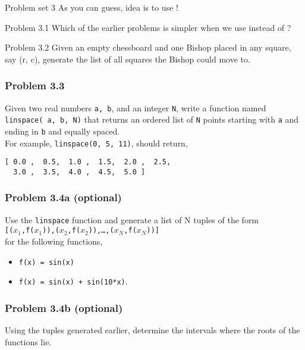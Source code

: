 \documentclass[14pt,compress]{beamer}
\newcounter{time}
\newcommand{\inctime}[1]{\addtocounter{time}{#1}{\tiny \thetime\ m}}
\newcommand{\typ}[1]{\texttt{#1}}
\newcommand{\kwrd}[1]{ \texttt{\textbf{\color{blue}{#1}}}  }
\begin{document}

\begin{frame}
  {Problem set 3}
  As you can guess, idea is to use \kwrd{for}!
\end{frame}

\begin{frame}{Problem 3.1}
  Which of the earlier problems is simpler when we use \kwrd{for} instead of \kwrd{while}? 
\end{frame}

\begin{frame}{Problem 3.2}
  Given an empty chessboard and one Bishop placed in any square, say (r, c), generate the list of all squares the Bishop could move to.
\end{frame}

\begin{frame}[fragile]
  \frametitle{Problem 3.3}

  Given two real numbers \typ{a, b}, and an integer \typ{N}, write a
  function named \typ{linspace( a, b, N)} that returns an ordered list
  of \typ{N} points starting with \typ{a} and ending in \typ{b} and
  equally spaced.\\

  For example, \typ{linspace(0, 5, 11)}, should return, \\
\begin{lstlisting}
[ 0.0 ,  0.5,  1.0 ,  1.5,  2.0 ,  2.5,  
  3.0 ,  3.5,  4.0 ,  4.5,  5.0 ]
\end{lstlisting}
\end{frame}

\begin{frame}[fragile]
  \frametitle{Problem 3.4a (optional)}

Use the \typ{linspace} function and generate a list of N tuples of the form\\
\typ{[($x_1$,f($x_1$)),($x_2$,f($x_2$)),\ldots,($x_N$,f($x_N$))]}\\for the following functions,\begin{itemize}
  \item \typ{f(x) = sin(x)}
  \item \typ{f(x) = sin(x) + sin(10*x)}.
\end{itemize}
\end{frame}

\begin{frame}[fragile]
  \frametitle{Problem 3.4b (optional)}

  Using the tuples generated earlier, determine the intervals where the roots of the functions lie.

  \inctime{15}
\end{frame}
\end{document}
